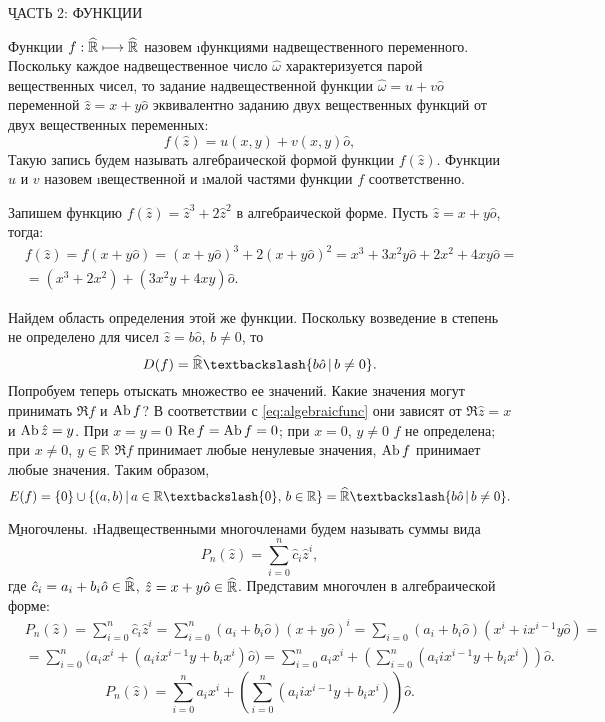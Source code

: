 \begin{center}
	\b{ЧАСТЬ 2: ФУНКЦИИ}
\end{center}

Функции $f: \widehat{\mathbb{R}} \longmapsto \widehat{\mathbb{R}}$ назовем \i{функциями надвещественного переменного}. Поскольку каждое надвещественное число $\hat{\omega}$ характеризуется парой вещественных чисел, то задание надвещественной функции $\hat{\omega}=u+v\hat{o}$ переменной $\hat{z}=x+y\hat{o}$ эквивалентно заданию двух вещественных функций от двух вещественных переменных:
\begin{equation}\label{eq:algebraicfunc}
	f(\hat{z})=u(x, y)+v(x, y)\hat{o},
\end{equation}
Такую запись будем называть алгебраической формой функции $f(\hat{z})$. Функции $u$ и $v$ назовем \i{вещественной} и \i{малой} частями функции $f$ соответственно.
\begin{example}
	Запишем функцию $f(\hat{z})=\hat{z}^3+2\hat{z}^2$ в алгебраической форме. Пусть $\hat{z}=x+y\hat{o}$, тогда:
	\begin{eqnarray*}
		&f(\hat{z})=f(x+y\hat{o})=(x+y\hat{o})^3+2(x+y\hat{o})^2=x^3+3x^2y\hat{o}+2x^2+4xy\hat{o}=      \\ &=(x^3+2x^2)+(3x^2y+4xy)\hat{o}.
	\end{eqnarray*}
\end{example}
\begin{example}
	Найдем область определения этой же функции. Поскольку возведение в степень не определено для чисел $\hat{z}=b\hat{o}$, $b\neq 0$, то 
		$$D(f)=\AbR\textbackslash\{b\hat{o}\,|\,b\neq 0\}.$$
	Попробуем теперь отыскать множество ее значений. Какие значения могут принимать $\Re{f}$ и $\operatorname{Ab}{f}$? В соответствии с \eqref{eq:algebraicfunc} они зависят от $\Re{\hat{z}}=x$ и $\operatorname{Ab}{\hat{z}}=y$. При $x=y=0$ $\operatorname{Re} f=\operatorname{Ab}{f}=0$; при $x=0$, $y\neq 0$ $f$ не определена; при $x\neq 0$, $y\in\mathbb{R}$ $\Re{f}$ принимает любые ненулевые значения, $\operatorname{Ab}{f}$ принимает любые значения. Таким образом, 
		$$E(f)=\{0\}\cup\{(a, b)\,|\,a\in\mathbb{R}\textbackslash\{0\},\,b\in\mathbb{R}\}\hm=\AbR\textbackslash\{b\hat{o}\,|\,b\neq 0\}.$$
\end{example}
\b{Многочлены.} \i{Надвещественными многочленами} будем называть суммы вида
	\begin{equation}\label{eq:polynomdef}
		P_n (\hat{z})=\sum_{i=0}^n \hat{c}_i\hat{z}^i,
	\end{equation}
где $\hat{c}_i=a_i+b_i\hat{o}\in\widehat{\mathbb{R}}$, $\hat{z}=x+y\hat{o}\in\widehat{\mathbb{R}}$. Представим многочлен в алгебраической форме:
	\begin{eqnarray*}
		& P_n(\hat{z})=\sum\limits_{i=0}^n \hat{c}_i\hat{z}^i=\sum\limits_{i=0}^n (a_i+b_i\hat{o})(x+y\hat{o})^i=\sum\limits_{i=0} (a_i+b_i\hat{o})(x^i+ix^{i-1}y\hat{o})=\\
		& =\sum\limits_{i=0}^n \big(a_ix^i+(a_iix^{i-1}y+b_ix^i)\hat{o}\big)=\sum\limits_{i=0}^n a_ix^i+\left(\sum\limits_{i=0}^n (a_iix^{i-1}y+b_ix^i)\right)\hat{o}.
	\end{eqnarray*}
	\begin{equation}\label{eq:algebraicpolynom}
		P_n(\hat{z})=\sum_{i=0}^n a_ix^i+\left(\sum_{i=0}^n (a_iix^{i-1}y+b_ix^i)\right)\hat{o}.
	\end{equation}

